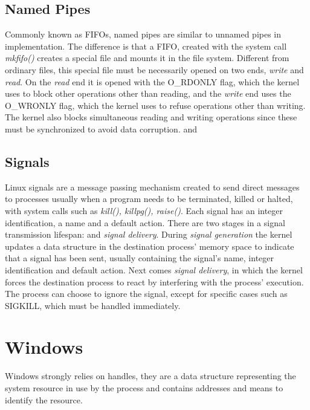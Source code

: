 \documentclass[12pt]{article}
\begin{document}
\subsection{Named Pipes}
	Commonly known as FIFOs, named pipes are similar to unnamed pipes in implementation. The difference is that a FIFO, created with the system call \emph{mkfifo()} creates a special file and mounts it in the file system. Different from ordinary files, this special file must be necessarily opened on two ends, \emph{write} and \emph{read}. On the \emph{read} end it is opened with the O\_RDONLY flag, which the kernel uses to block other operations other than reading, and the \emph{write} end uses the O\_WRONLY flag, which the kernel uses to refuse operations other than writing. The kernel also blocks simultaneous reading and writing operations since these must be synchronized to avoid data corruption. \cite{fifo:1} and \cite{pipe:2}
	
\subsection{Signals}
	Linux signals are a message passing mechanism created to send direct messages to processes usually when a program needs to be terminated, killed or halted, with system calls such as \emph{kill(), killpg(), raise()}. Each signal has an integer identification, a name and a default action. 
There are two stages in a signal transmission lifespan:  and \emph{signal delivery}. During \emph{signal generation} the kernel updates a data structure in the destination process’ memory space to indicate that a signal has been sent, usually containing the signal’s name, integer identification and default action. Next comes \emph{signal delivery}, in which the kernel forces the destination process to react by interfering with the process’ execution. The process can choose to ignore the signal, except for specific cases such as SIGKILL, which must be handled immediately. \cite{linuxkernel:1}

\section{Windows}
Windows strongly relies on handles, they are a data structure representing the system resource in use by the process and contains addresses and means to identify the resource. \cite{handles:1}
\end{document}
